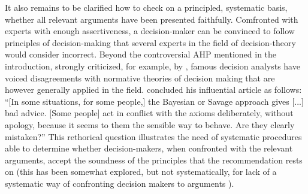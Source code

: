 \documentclass[version=last, pagesize, twoside=off, bibliography=totoc, DIV=calc, fontsize=12pt, a4paper, french, english]{scrartcl}
\begin{document}
It also remains to be clarified how to check on a principled, systematic basis, whether all relevant arguments have been presented faithfully. Comfronted with 
experts with enough assertiveness, a decision-maker can be convinced to follow principles of decision-making that several experts in the field of decision-theory would consider incorrect. 
Beyond the controversial \ac{AHP} mentioned in the introduction, strongly criticized, for example, by \citet[p.\ 53]{howard_foundations_2007}, famous decision analysts have voiced disagreements with normative theories of decision making \citep{ellsberg_risk_1961, allais_so-called_1979} that are however generally applied in the field.  
 concluded his influential article as follows: “[In some situations, for some people,] the Bayesian or Savage approach gives [...] bad advice. [Some people] act in conflict with the axioms deliberately, without apology, because it seems to them the sensible way to behave. Are they clearly mistaken?” 
This rethorical question illustrates the need of systematic procedures able to determine whether decision-makers, when confronted with the relevant arguments, accept the soundness of the principles that the recommendation rests on (this has been somewhat explored, but not systematically, for lack of a systematic way of confronting decision makers to arguments \citep{slovic_who_1974, stanovich_discrepancies_1999}). 
\end{document}
